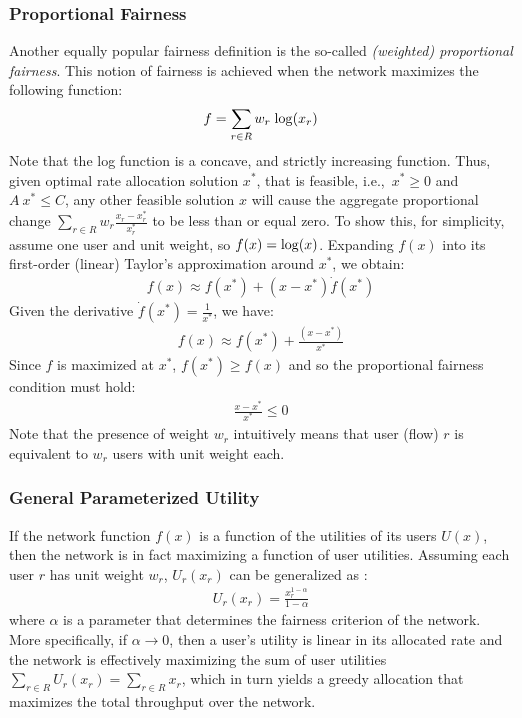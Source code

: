 \documentclass{article}
\def\lg{{\rm log}}
\begin{document}
\subsubsection{Proportional Fairness}

Another equally popular fairness definition is the so-called {\em (weighted) proportional fairness}. This notion of fairness is achieved when the network maximizes the following function:
\begin{eqnarray*}
f = \sum_{r \in R} w_r \; \lg(x_r)
\label{eq:prop-fair}
\end{eqnarray*}
Note that the log function is a concave, and strictly increasing function. Thus, given optimal rate allocation solution $x^*$, that is feasible, i.e.,\ $x^* \geq 0$ and $A\ x^* \leq C$, any other feasible solution $x$ will cause the aggregate proportional change $\sum_{r \in R} w_r \frac{x_r - x^*_r}{x^*_r}$ to be less than or equal zero.  To show this, for simplicity, assume one user and unit weight, so $f(x) = \lg(x)$. Expanding $f(x)$ into its first-order (linear) Taylor's approximation around $x^*$, we obtain:
\begin{eqnarray*}
f(x) \approx f(x^*) + (x - x^*) \dot{f}(x^*)
\end{eqnarray*}
Given the derivative $\dot{f}(x^*) = \frac{1}{x^*}$, we have:
\begin{eqnarray*}
f(x) \approx f(x^*) + \frac{(x - x^*)}{x^*} 
\end{eqnarray*}
Since $f$ is maximized at $x^*$, $f(x^*) \ge f(x)$ and so the proportional fairness condition must hold: 
\begin{eqnarray*}
\frac{x - x^*}{x^*} \leq 0 
\end{eqnarray*}
Note that the presence of weight $w_r$ intuitively means that user (flow) $r$ is equivalent to $w_r$ users with unit weight each.

\subsubsection{General Parameterized Utility}

If the network function $f(x)$ is a function of the utilities of its users $U(x)$, then the network is in fact maximizing a function of user utilities. Assuming each user $r$ has unit weight $w_r$, $U_r(x_r)$ can be generalized as \cite{Mo:2000}:
\begin{eqnarray*}
U_r(x_r) = \frac{x_r^{1-\alpha}}{1-\alpha}
\end{eqnarray*}
where $\alpha$ is a parameter that determines the fairness criterion of the network. More specifically, if $\alpha \rightarrow 0$, then a user's utility is linear in its allocated rate and the network is effectively maximizing the sum of user utilities $\sum_{r \in R} U_r(x_r) = \sum_{r \in R} x_r$, which in turn yields a greedy allocation that maximizes the total throughput over the network.
\end{document}
